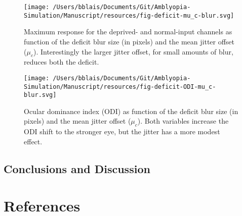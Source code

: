 \documentclass[
  onecolumn]{article}
\begin{document}
\begin{figure}
\hypertarget{fig:deficit-mu_c-blur}{%
\centering
\texttt{[image: /Users/bblais/Documents/Git/Amblyopia-Simulation/Manuscript/resources/fig-deficit-mu\_c-blur.svg]}
\caption{Maximum response for the deprived- and normal-input channels as
function of the deficit blur size (in pixels) and the mean jitter offset
(\(\mu_c\)). Interestingly the larger jitter offset, for small amounts
of blur, reduces both the deficit.}\label{fig:deficit-mu_c-blur}
}
\end{figure}

\begin{figure}
\hypertarget{fig:deficit-ODI-mu_c-blur}{%
\centering
\texttt{[image: /Users/bblais/Documents/Git/Amblyopia-Simulation/Manuscript/resources/fig-deficit-ODI-mu\_c-blur.svg]}
\caption{Ocular dominance index (ODI) as function of the deficit blur
size (in pixels) and the mean jitter offset (\(\mu_c\)). Both variables
increase the ODI shift to the stronger eye, but the jitter has a more
modest effect.}\label{fig:deficit-ODI-mu_c-blur}
}
\end{figure}

\hypertarget{conclusions-and-discussion}{%
\subsection{Conclusions and
Discussion}\label{conclusions-and-discussion}}

\hypertarget{references}{%
\section*{References}\label{references}}
\end{document}
